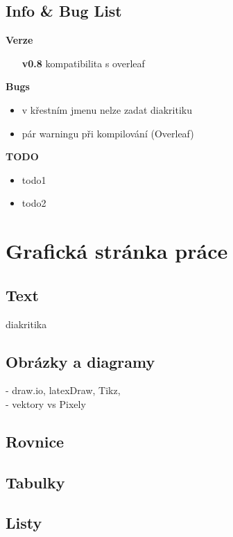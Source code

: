 \section{Info \& Bug List}

\large{\bf{Verze}}
\begin{itemize}
	\item[\textbf{v0.8}] kompatibilita s overleaf
\end{itemize}

\large{\bf{Bugs}}
\begin{itemize}
	\item v křestním jmenu nelze zadat diakritiku
    \item pár warningu při kompilování (Overleaf)
\end{itemize}

\large{\bf{TODO}}
\begin{itemize}
	\item todo1
    \item todo2
\end{itemize}


\chapter{Grafick\'{a} str\'{a}nka pr\'{a}ce}
\label{chap:grafika}

\section{Text}
diakritika

\section{Obr\'{a}zky a diagramy}
 - draw.io, latexDraw, Tikz,\\
 - vektory vs Pixely

\section{Rovnice}

\section{Tabulky}

\section{Listy}

